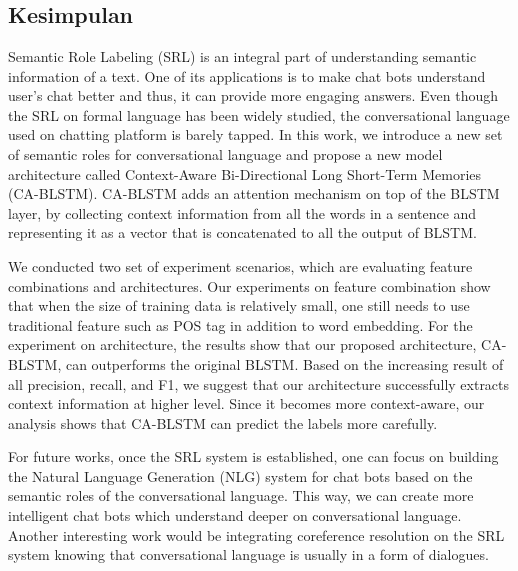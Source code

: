 \chapter{\babEnam}

\section{Kesimpulan}
Semantic Role Labeling (SRL) is an integral part of understanding semantic information of a text. One of its applications is to make chat bots understand user's chat better and thus, it can provide more engaging answers. Even though the SRL on formal language has been widely studied, the conversational language used on chatting platform is barely tapped. In this work, we introduce a new set of semantic roles for conversational language and propose a new model architecture called Context-Aware Bi-Directional Long Short-Term Memories (CA-BLSTM). CA-BLSTM adds an attention mechanism on top of the BLSTM layer, by collecting context information from all the words in a sentence and representing it as a vector that is concatenated to all the output of BLSTM.

We conducted two set of experiment scenarios, which are evaluating feature combinations and architectures. Our experiments on feature combination show that when the size of training data is relatively small, one still needs to use traditional feature such as POS tag in addition to word embedding. For the experiment on architecture, the results show that our proposed architecture, CA-BLSTM, can outperforms the original BLSTM. Based on the increasing result of all precision, recall, and F1, we suggest that our architecture successfully extracts context information at higher level. Since it becomes more context-aware, our analysis shows that CA-BLSTM can predict the labels more carefully.

For future works, once the SRL system is established, one can focus on building the Natural Language Generation (NLG) system for chat bots based on the semantic roles of the conversational language. This way, we can create more intelligent chat bots which understand deeper on conversational language. Another interesting work would be integrating coreference resolution on the SRL system knowing that conversational language is usually in a form of dialogues.

